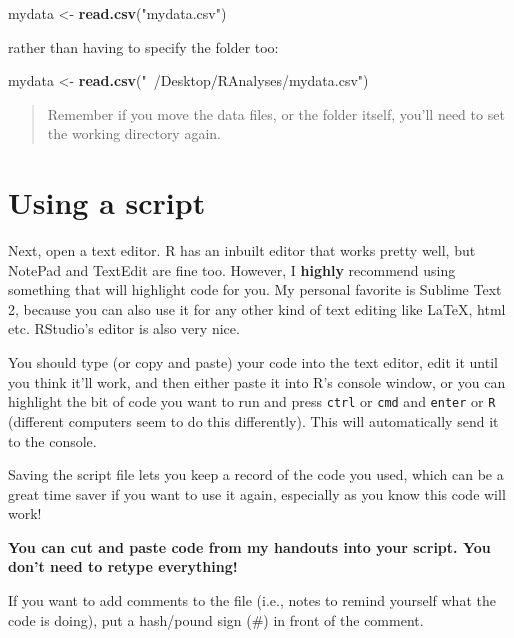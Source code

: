 \documentclass[]{book}
\newenvironment{Shaded}{\begin{snugshade}}{\end{snugshade}}
\newcommand{\KeywordTok}[1]{\textcolor[rgb]{0.13,0.29,0.53}{\textbf{{#1}}}}
\newcommand{\StringTok}[1]{\textcolor[rgb]{0.31,0.60,0.02}{{#1}}}
\newcommand{\NormalTok}[1]{{#1}}
\begin{document}
\begin{Shaded}
\begin{Highlighting}[]
\NormalTok{mydata <-}\StringTok{ }\KeywordTok{read.csv}\NormalTok{(}\StringTok{"mydata.csv"}\NormalTok{)}
\end{Highlighting}
\end{Shaded}

rather than having to specify the folder too:

\begin{Shaded}
\begin{Highlighting}[]
\NormalTok{mydata <-}\StringTok{ }\KeywordTok{read.csv}\NormalTok{(}\StringTok{"~/Desktop/RAnalyses/mydata.csv"}\NormalTok{)}
\end{Highlighting}
\end{Shaded}

\begin{quote}
Remember if you move the data files, or the folder itself, you'll need
to set the working directory again.
\end{quote}

\section{Using a script}\label{using-a-script}

Next, open a text editor. R has an inbuilt editor that works pretty
well, but NotePad and TextEdit are fine too. However, I \textbf{highly}
recommend using something that will highlight code for you. My personal
favorite is Sublime Text 2, because you can also use it for any other
kind of text editing like LaTeX, html etc. RStudio's editor is also very
nice.

You should type (or copy and paste) your code into the text editor, edit
it until you think it'll work, and then either paste it into R's console
window, or you can highlight the bit of code you want to run and press
\texttt{ctrl} or \texttt{cmd} and \texttt{enter} or \texttt{R}
(different computers seem to do this differently). This will
automatically send it to the console.

Saving the script file lets you keep a record of the code you used,
which can be a great time saver if you want to use it again, especially
as you know this code will work!

\textbf{You can cut and paste code from my handouts into your script.
You don't need to retype everything!}

If you want to add comments to the file (i.e., notes to remind yourself
what the code is doing), put a hash/pound sign (\#) in front of the
comment.
\end{document}
